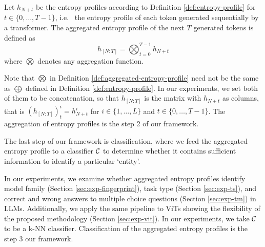 \begin{definition} \label{def:aggregated-entropy-profile}
Let $h_{N+t}$ be the entropy profiles according to Definition \ref{def:entropy-profile} for $t\in\{0,\dots,T-1\}$, i.e.~ the entropy profile of each token generated sequentially by a transformer. The aggregated entropy profile of the next $T$ generated tokens is defined as 
\begin{equation}
    h_{[N:T]} = \bigotimes_{t=0}^{T-1} h_{N+t}
\end{equation}
where $\bigotimes$ denotes any aggregation function. 
\end{definition}

Note that $\bigotimes$ in Definition \ref{def:aggregated-entropy-profile} need not be the same as $\bigoplus$ defined in Definition \ref{def:entropy-profile}. In our experiments, we set both of them to be concatenation, so that $h_{[N:T]}$ is the matrix with $h_{N+t}$ as columns, that is $(h_{[N:T]})_{t}^i=h_{N+t}^i$ for $i\in\{1,\dots,L\}$ and $t\in\{0,\dots,T-1\}$. The aggregation of entropy profiles is the step 2 of our framework.

The last step of our framework is classification, where we feed the aggregated entropy profile to a classifier $\mathcal{C}$ to determine whether it contains sufficient information to identify a particular `entity'. 

In our experiments, we examine whether aggregated entropy profiles identify model family (Section \ref{sec:exp-fingerprint}), task type (Section \ref{sec:exp-ts}), and correct and wrong answers to multiple choice questions (Section \ref{sec:exp-tm}) in LLMs. Additionally, we apply the same pipeline to ViTs showing the flexibility of the proposed methodology (Section \ref{sec:exp-vit}).  %
In our experiments, we take $\mathcal{C}$ to be a k-NN classifier. Classification of the aggregated entropy profiles is the step 3 our framework.


